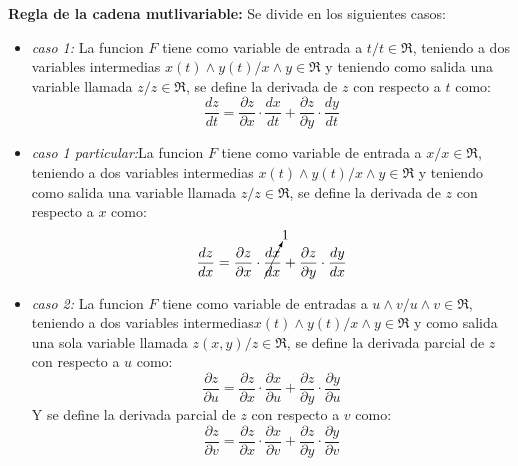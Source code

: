 \documentclass[12pt,a4paper]{article}
\begin{document}
  \textbf{Regla de la cadena mutlivariable:}
  Se divide en los siguientes casos:
  \begin{itemize}
    \item \textit{caso 1:} La funcion $F$ tiene como variable de entrada a $t/t \in \Re$, teniendo a dos variables intermedias $x(t) \wedge y(t)/ x \wedge y \in \Re $ y teniendo como salida una variable llamada $z/z\in \Re$, se define la derivada de $z$ con respecto a $t$ como:
    $$\dfrac{dz}{dt}=\dfrac{\partial z}{\partial x}\cdot \dfrac{d x}{dt}+\dfrac{\partial z}{\partial y}\cdot \dfrac{dy}{dt}$$
    \item \textit{caso 1 particular:}La funcion $F$ tiene como variable de entrada a $x/x \in \Re$, teniendo a dos variables intermedias $x(t) \wedge y(t)/ x \wedge y \in \Re $ y teniendo como salida una variable llamada $z/z\in \Re$, se define la derivada de $z$ con respecto a $x$ como:
    $$\dfrac{dz}{dx}=\dfrac{\partial z}{\partial x}\cdot \cancelto{1}{\dfrac{d x}{dx}}+\dfrac{\partial z}{\partial y}\cdot \dfrac{dy}{dx}$$
    \item \textit{caso 2:} La funcion $F$ tiene como variable de entradas a $u\wedge v/u\wedge v \in \Re$, teniendo a dos variables intermedias$x(t)\wedge y(t)/ x\wedge y \in \Re$ y como salida una sola variable llamada $z(x,y)/z \in \Re$, se define la derivada parcial de $z$ con respecto a $u$ como:
    $$ \dfrac{\partial z}{\partial u} =\dfrac{\partial z}{\partial x} \cdot \dfrac{\partial x}{\partial u}+\dfrac{\partial z}{\partial y}\cdot \dfrac{\partial y}{\partial u}$$
    Y se define la derivada parcial de $z$ con respecto a $v$ como:
   $$ \dfrac{\partial z}{\partial v} =\dfrac{\partial z}{\partial x} \cdot \dfrac{\partial x}{\partial v}+\dfrac{\partial z}{\partial y}\cdot \dfrac{\partial y}{\partial v}$$


\end{itemize}
\end{document}

